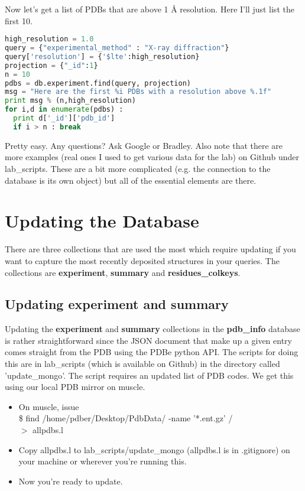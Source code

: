 \documentclass[12pt]{article}
\newcommand{\mdbdb}[1]{{\color{BlueViolet}\textbf{#1}}}
\newcommand{\mdbcol}[1]{{\color{Bittersweet}\textbf{#1}}}
\begin{document}
\noindent
Now let's get a list of PDBs that are above 1 \AA{} resolution.
Here I'll just list the first 10.

\begin{lstlisting}[language=python]
high_resolution = 1.0
query = {"experimental_method" : "X-ray diffraction"}
query['resolution'] = {'$lte':high_resolution}
projection = {"_id":1}
n = 10
pdbs = db.experiment.find(query, projection)
msg = "Here are the first %i PDBs with a resolution above %.1f"
print msg % (n,high_resolution)
for i,d in enumerate(pdbs) :
  print d['_id']['pdb_id']
  if i > n : break
\end{lstlisting}

\noindent
Pretty easy.
Any questions?
Ask Google or Bradley.
Also note that there are more examples (real ones I used to get various data for the lab) on Github under lab\_scripts.
These are a bit more complicated (e.g. the connection to the database is its own object) but all of the essential elements are there.

\section{Updating the Database}

There are three collections that are used the most which require updating if you want to capture the most recently deposited structures in your queries. The collections are \mdbcol{experiment}, \mdbcol{summary} and \mdbcol{residues\_colkeys}.

\subsection{Updating \mdbcol{experiment} and \mdbcol{summary}}

Updating the \mdbcol{experiment} and \mdbcol{summary} collections in the \mdbdb{pdb\_info} database is rather straightforward since the JSON document that make up a given entry comes straight from the PDB using the PDBe python API. The scripts for doing this are in lab\_scripts (which is available on Github) in the directory called 'update\_mongo'. The script requires an updated list of PDB codes. We get this using our local PDB mirror on muscle.

\begin{itemize}
\item On muscle, issue \\
\indent
\$ find /home/pdber/Desktop/PdbData/ -name '*.ent.gz' /\\ $>$ allpdbs.l
\item Copy allpdbs.l to lab\_scripts/update\_mongo (allpdbs.l is in .gitignore) on your machine or wherever you're running this.
\item Now you're ready to update.
\end{itemize}
\end{document}

